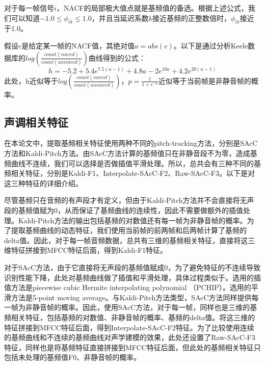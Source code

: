对于每一帧信号$i$，NACF的局部极大值点就是基频值的备选。根据上述公式，我们可以知道$-1.0\leqslant\phi_{ik}\leqslant1.0$，并且当延迟系数$k$接近基频的正整数倍时，$\phi_{ik}$接近于1.0。

假设c是给定某一帧的NACF值，其绝对值$a=abs(c)$。以下是通过分析Keele数据库的$log(\frac{count(voiced)}{count(unvoiced)})$曲线得到的公式：
\begin{equation}h=-5.2+5.4 e^{7.5 (a-1)}+4.8 a-2 e^{10 a}+4.2 e^{20 (a-1)}\end{equation}
此处，h近似等于$log(\frac{count(voiced)}{count(unvoiced)})$，$p=\frac{1}{1+e^{-h}}$近似等于当前帧是非静音帧的概率。
\subsection{声调相关特征}
在本论文中，提取基频相关特征使用两种不同的pitch-tracking方法，分别是SAcC方法和Kaldi-Pitch方法。由SAcC方法计算的基频值只在非静音段不为零，造成基频曲线不连续，我们可以选择是否做插值平滑处理。所以，总共会有三种不同的基频相关特征，分别是Kaldi-F1、Interpolate-SAcC-F2、Raw-SAcC-F3。以下是对这三种特征的详细介绍。

尽管基频只在音频的有声段才有定义，但由于Kaldi-Pitch方法并不会直接将无声段的基频值赋为0，从而保证了基频曲线的连续性，因此不需要做额外的插值处理。Kaldi-Pitch方法的输出包括基频的对数值还有每一帧为非静音帧的概率。为了提取基频曲线的动态特征，我们使用当前帧的前两帧和后两帧计算了基频的delta值。因此，对于每一帧音频数据，总共有三维的基频相关特征，直接将这三维特征拼接到MFCC特征后面，得到Kaldi-F1特征。

对于SAcC方法，由于它直接将无声段的基频值赋成0，为了避免特征的不连续导致识别性能下降，此处对基频曲线做了插值和平滑处理，具体过程类似于\cite{lei2006improved}。选用的插值方法是piecewise cubic Hermite interpolating polynomial （PCHIP）\cite{fritsch1980monotone}。选用的平滑方法是5-point moving average。与Kaldi-Pitch方法类型，SAcC方法同样提供每一帧为非静音帧的概率。因此，使用SAcC方法，对于每一帧，同样也是三维的基频相关特征，包括基频的对数值、非静音帧的概率、基频的delta值。将这三维的特征拼接到MFCC特征后面，得到Interpolate-SAcC-F2特征。为了比较使用连续的基频曲线和不连续的基频曲线对声学建模的效果，此处还设置了Raw-SAcC-F3特征，同样也是将基频特征直接拼接到MFCC特征后面，但此处的基频相关特征只包括未处理的基频值F0、非静音帧的概率。

